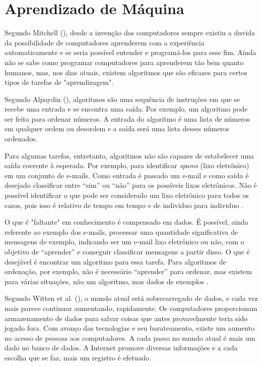 \section{Aprendizado de Máquina}
\label{machineLearning}

Segundo Mitchell (\citeyear{Mitchell:1997:ML:541177}), desde a invenção dos computadores sempre existiu a duvida da possibilidade de computadores aprenderem com a experiência automaticamente e se seria possível entender e programá-los para esse fim. Ainda não se sabe como programar computadores para aprenderem tão bem quanto humanos, mas, nos dias atuais, existem algoritmos que são eficazes para certos tipos de tarefas de "aprendizagem". 

Segundo Alpaydin (\citeyear{Alpaydin:2010:IML:1734076}), algoritmos são uma sequência de instruções em que se recebe uma entrada e se encontra uma saída. Por exemplo, um algoritmo pode ser feito para ordenar números. A entrada do algoritmo é uma lista de números em qualquer ordem ou desordem e a saída será uma lista desses números ordenados.

Para algumas tarefas, entretanto, algoritmos não são capazes de estabelecer uma saída coerente à esperada. Por exemplo, para identificar \textit{spams} (lixo eletrônico) em um conjunto de e-mails. Como entrada é passado um e-mail e como saída é desejado classificar entre “sim” ou “não” para os possíveis lixos eletrônicos. Não é possível identificar o que pode ser considerado um lixo eletrônico para todos os casos, pois isso é relativo de tempo em tempo e de individuo para individuo \cite{Alpaydin:2010:IML:1734076}.

O que é "faltante" em conhecimento é compensado em dados. É possível, ainda referente ao exemplo dos e-mails, processar uma quantidade significativa de mensagens de exemplo, indicando ser um e-mail lixo eletrônico ou não, com o objetivo de “aprender” e conseguir classificar mensagens a partir disso. O que é desejável é encontrar um algoritmo para essa tarefa. Para algoritmos de ordenação, por exemplo, não é necessário “aprender” para ordenar, mas existem para várias situações, não um algoritmo, mas dados de exemplos \cite{Alpaydin:2010:IML:1734076}.


Segundo Witten et al. (\citeyear{Witten:2016:DMF:3086818}), o mundo atual está sobrecarregado de dados, e cada vez mais parece continuar aumentando, rapidamente. Os computadores proporcionam armazenamento de dados para salvar coisas que antes provavelmente teria sido jogado fora. Com avanço das tecnologias e seu barateamento, existe um aumento no acesso de pessoas aos computadores. A cada passo no mundo atual é mais um dado no banco de dados. A Internet promove diversas informações e a cada escolha que se faz, mais um registro é efetuado.	

